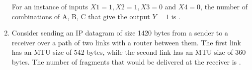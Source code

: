 \documentclass[a4paper, 11pt]{article}
\begin{document}
\begin{enumerate}
    For an instance of inputs $X1=1, X2=1, X3=0$ and $X4=0$, the number of combinations of A, B, C that give the output $Y=1$ is \underline{\hspace{2cm}}.

    \hfill{}

    \item Consider sending an IP datagram of size 1420 bytes  from a sender to a receiver over a path of two links with a router between them. The first link  has an MTU  size of 542 bytes, while the second link  has an MTU size of 360 bytes. The number of fragments that would be delivered at the receiver is \underline{\hspace{2cm}}.

    \hfill{}

\end{enumerate}
\end{document}

